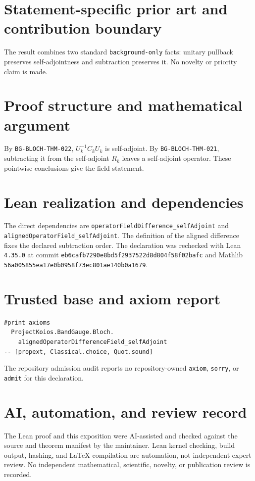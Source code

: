 \documentclass[11pt]{article}
\begin{document}
\section{Statement-specific prior art and contribution boundary}
The result combines two standard \texttt{background-only} facts: unitary pullback preserves self-adjointness and subtraction preserves it.  No novelty or priority claim is made.

\section{Proof structure and mathematical argument}
By \texttt{BG-BLOCH-THM-022}, $U_k^{-1}C_kU_k$ is self-adjoint.  By \texttt{BG-BLOCH-THM-021}, subtracting it from the self-adjoint $R_k$ leaves a self-adjoint operator.  These pointwise conclusions give the field statement.

\section{Lean realization and dependencies}
The direct dependencies are \texttt{operatorFieldDifference\_selfAdjoint} and \texttt{alignedOperatorField\_selfAdjoint}.  The definition of the aligned difference fixes the declared subtraction order.  The declaration was rechecked with Lean \texttt{4.35.0} at commit \texttt{eb6cafb7290e8bd5f2937522d8d804f58f02bafc} and Mathlib \texttt{56a005855ea17e0b0958f73ec801ae140b0a1679}.

\section{Trusted base and axiom report}
\begin{verbatim}
#print axioms
  ProjectKoios.BandGauge.Bloch.
    alignedOperatorDifferenceField_selfAdjoint
-- [propext, Classical.choice, Quot.sound]
\end{verbatim}
The repository admission audit reports no repository-owned \texttt{axiom}, \texttt{sorry}, or
\texttt{admit} for this declaration.

\section{AI, automation, and review record}
The Lean proof and this exposition were AI-assisted and checked against the source and theorem
manifest by the maintainer.  Lean kernel checking, build output, hashing, and LaTeX compilation are
automation, not independent expert review.  No independent mathematical, scientific, novelty, or
publication review is recorded.
\end{document}
